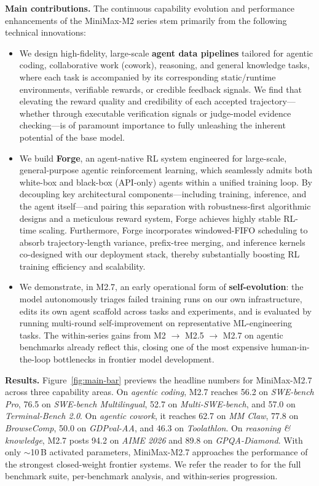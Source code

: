 \noindent \textbf{Main contributions.} The continuous capability evolution and performance enhancements of the MiniMax-M2 series stem primarily from the following technical innovations:
\begin{itemize}
    \item We design high-fidelity, large-scale \textbf{agent data pipelines} tailored for agentic coding, collaborative work (cowork), reasoning, and general knowledge tasks, where each task is accompanied by its corresponding static/runtime environments, verifiable rewards, or credible feedback signals. We find that elevating the reward quality and credibility of each accepted trajectory---whether through executable verification signals or judge-model evidence checking---is of paramount importance to fully unleashing the inherent potential of the base model.

    \item We build \textbf{Forge}, an agent-native RL system engineered for large-scale, general-purpose agentic reinforcement learning, which seamlessly admits both white-box and black-box (API-only) agents within a unified training loop. By decoupling key architectural components---including training, inference, and the agent itself---and pairing this separation with robustness-first algorithmic designs and a meticulous reward system, Forge achieves highly stable RL-time scaling. Furthermore, Forge incorporates windowed-FIFO scheduling to absorb trajectory-length variance, prefix-tree merging, and inference kernels co-designed with our deployment stack, thereby substantially boosting RL training efficiency and scalability.

    \item We demonstrate, in M2.7, an early operational form of \textbf{self-evolution}: the model autonomously triages failed training runs on our own infrastructure, edits its own agent scaffold across tasks and experiments, and is evaluated by running multi-round self-improvement on representative ML-engineering tasks. The within-series gains from M2 $\to$ M2.5 $\to$ M2.7 on agentic benchmarks already reflect this, closing one of the most expensive human-in-the-loop bottlenecks in frontier model development.
\end{itemize}

\noindent \textbf{Results.} Figure~\ref{fig:main-bar} previews the headline numbers for MiniMax-M2.7 across three capability areas. On \emph{agentic coding}, M2.7 reaches 56.2 on \emph{SWE-bench Pro}, 76.5 on \emph{SWE-bench Multilingual}, 52.7 on \emph{Multi-SWE-bench}, and 57.0 on \emph{Terminal-Bench 2.0}. On \emph{agentic cowork}, it reaches 62.7 on \emph{MM Claw}, 77.8 on \emph{BrowseComp}, 50.0 on \emph{GDPval-AA}, and 46.3 on \emph{Toolathlon}. On \emph{reasoning \& knowledge}, M2.7 posts 94.2 on \emph{AIME 2026} and 89.8 on \emph{GPQA-Diamond}. With only $\sim$10\,B activated parameters, MiniMax-M2.7 approaches the performance of the strongest closed-weight frontier systems. We refer the reader to  for the full benchmark suite, per-benchmark analysis, and within-series progression.
